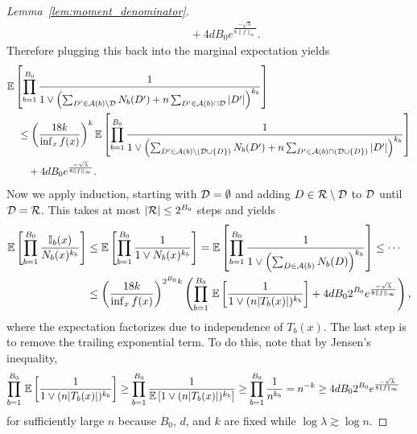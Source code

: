 \begin{proof}[Lemma~\ref{lem:moment_denominator}]
\begin{align*}
    &\qquad+
    4 d B_0 e^{\frac{-\sqrt \lambda}{8 \|f\|_\infty}}.
  \end{align*}
  Therefore plugging this back into the marginal expectation yields
  \begin{align*}
    &\mathbb{E}\left[
      \prod_{b=1}^{B_0}
      \frac{1}{
        1 \vee \left(
          \sum_{D' \in \mathcal{A}(b) \setminus \mathcal{D}}
          N_b(D')
          + n \sum_{D' \in \mathcal{A}(b) \cap \mathcal{D}}
          |D'|
        \right)^{k_b}
      }
    \right] \\
    &\quad\leq
    \left( \frac{18k}{\inf_x f(x)} \right)^k
    \mathbb{E} \left[
      \prod_{b=1}^{B_0}
      \frac{1}{
        1 \vee \left(
          \sum_{D' \in \mathcal{A}(b) \setminus (\mathcal{D} \cup \{D\})}
          N_b(D')
          + n \sum_{D' \in \mathcal{A}(b) \cap (\mathcal{D} \cup \{D\})}
          |D'|
      \right)^{k_b}}
    \right] \\
    &\qquad+
    4 d B_0 e^{\frac{-\sqrt \lambda}{8 \|f\|_\infty}}.
  \end{align*}
  Now we apply induction,
  starting with $\mathcal{D} = \emptyset$ and
  adding $D \in \mathcal{R} \setminus \mathcal{D}$ to $\mathcal{D}$ until
  $\mathcal{D} = \mathcal{R}$.
  This takes at most $|\mathcal{R}| \leq 2^{B_0}$ steps and yields
  \begin{align*}
    \mathbb{E}\left[
      \prod_{b=1}^{B_0}
      \frac{\mathbb{I}_b(x)}{N_b(x)^{k_b}}
    \right]
    &\leq
    \mathbb{E}\left[
      \prod_{b=1}^{B_0}
      \frac{1}{1 \vee N_b(x)^{k_b}}
    \right]
    =
    \mathbb{E}\left[
      \prod_{b=1}^{B_0}
      \frac{1}{1 \vee \left( \sum_{D \in \mathcal{A}(b)} N_b(D) \right)^{k_b}}
    \right]
    \leq \cdots \\
    &\leq
    \left( \frac{18k}{\inf_x f(x)} \right)^{2^{B_0} k}
    \left(
      \prod_{b=1}^{B_0}
      \,\mathbb{E} \left[
        \frac{1}{1 \vee (n |T_b(x)|)^{k_b}}
      \right]
      + 4 d B_0 2^{B_0} e^{\frac{-\sqrt \lambda}{8 \|f\|_\infty}}
    \right),
  \end{align*}
  where the expectation factorizes due to independence of $T_b(x)$.
  The last step is to remove the trailing exponential term.
  To do this, note that by Jensen's inequality,
  \begin{align*}
    \prod_{b=1}^{B_0}
    \,\mathbb{E} \left[
      \frac{1}{1 \vee (n |T_b(x)|)^{k_b}}
    \right]
    &\geq
    \prod_{b=1}^{B_0}
    \frac{1}
    {\mathbb{E} \left[ 1 \vee (n |T_b(x)|)^{k_b} \right]}
    \geq
    \prod_{b=1}^{B_0}
    \frac{1}{n^{k_b}}
    = n^{-k}
    \geq
    4 d B_0 2^{B_0} e^{\frac{-\sqrt \lambda}{8 \|f\|_\infty}}
  \end{align*}
  for sufficiently large $n$
  because $B_0$, $d$, and $k$ are fixed while
  $\log \lambda \gtrsim \log n$.
\end{proof}


